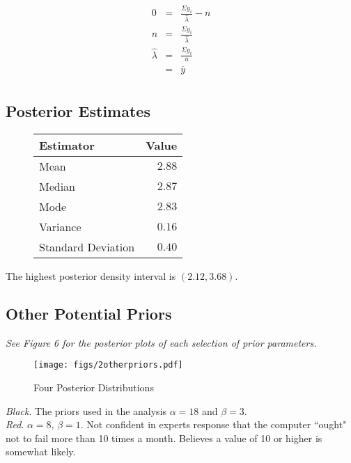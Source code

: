 \documentclass[12pt]{article}
\newcommand{\ybar}{\overline{y}}
\begin{document}
\begin{eqnarray*}
0 &=& \frac{\Sigma y_i}{\hat{\lambda}}-n \\
n &=& \frac{\Sigma y_i}{\hat{\lambda}} \\
\hat{\lambda} &=& \frac{\Sigma y_i}{n} \\
&=& \ybar \\
\end{eqnarray*}

\subsection{Posterior Estimates}

\begin{figure}[H]
\begin{center}
\begin{tabular}{l|r}
Estimator & \multicolumn{1}{l}{Value} \\ \hline \hline
Mean               & $2.88$ \\
Median             & $2.87$ \\
Mode               & $2.83$ \\
Variance           & $0.16$ \\
Standard Deviation & $0.40$ \\
\end{tabular}
\end{center}
\end{figure}

\noindent The highest posterior density interval is $(2.12, 3.68)$.

\subsection{Other Potential Priors}

\noindent \textit{See Figure 6 for the posterior plots of each selection of prior parameters.}
\bigskip

\begin{figure}
\begin{center}
\texttt{[image: figs/2otherpriors.pdf]}
\caption{Four Posterior Distributions}
\end{center}
\end{figure}

\noindent \textit{Black}.  The priors used in the analysis $\alpha=18$ and $\beta=3$. \\ [-0.3cm]

\noindent \textit{Red}. $\alpha=8$, $\beta=1$.  Not confident in experts response that the computer ``ought" not to fail more than 10 times a month.  Believes a value of 10 or higher is somewhat likely.  \\ [-0.3cm]
\end{document}
